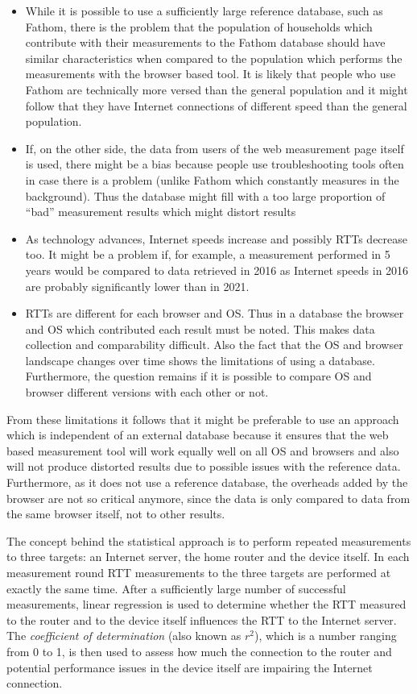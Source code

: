 \documentclass{sig-alternate-10pt}
\begin{document}
\begin{itemize}
\item While it is possible to use a sufficiently large reference database, such as Fathom, there is the problem that the population of households which contribute with their measurements to the Fathom database should have similar characteristics when compared to the population which performs the measurements with the browser based tool. It is likely that people who use Fathom are technically more versed than the general population and it might follow that they have Internet connections of different speed than the general population. 
\item If, on the other side, the data from users of the web measurement page itself is used, there might be a bias because people use troubleshooting tools often in case there is a problem (unlike Fathom which constantly measures in the background). Thus the database might fill with a too large proportion of ``bad'' measurement results which might distort results
\item As technology advances, Internet speeds increase and possibly RTTs decrease too. It might be a problem if, for example, a measurement performed in 5 years would be compared to data retrieved in 2016 as Internet speeds in 2016 are probably significantly lower than in 2021. 
\item RTTs are different for each browser and OS. Thus in a database the browser and OS which contributed each result must be noted. This makes data collection and comparability difficult. Also the fact that the OS and browser landscape changes over time shows the limitations of using a database. Furthermore, the question remains if it is possible to compare OS and browser different versions with each other or not. 
\end{itemize}

From these limitations it follows that it might be preferable to use an approach which is independent of an external database because it ensures that the web based measurement tool will work equally well on all OS and browsers and also will not produce distorted results due to possible issues with the reference data. Furthermore, as it does not use a reference database, the overheads added by the browser are not so critical anymore, since the data is only compared to data from the same browser itself, not to other results.

The concept behind the statistical approach is to perform repeated measurements to three targets: an Internet server, the home router and the device itself. In each measurement round RTT measurements to the three targets are performed at exactly the same time. After a sufficiently large number of successful measurements, linear regression is used to determine whether the RTT measured to the router and to the device itself influences the RTT to the Internet server. The \textit{coefficient of determination} (also known as $r^2$), which is a number ranging from 0 to 1, is then used to assess how much the connection to the router and potential performance issues in the device itself are impairing the Internet connection.
\end{document}
